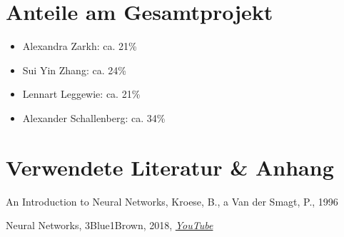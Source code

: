 \documentclass[paper=A4,pagesize=auto,12pt,headinclude=true,footinclude=true,BCOR=0mm,DIV=calc]{scrartcl}
\begin{document}
	\vspace{1cm}
	
	\section{Anteile am Gesamtprojekt}
	\begin{itemize}
		\item Alexandra Zarkh: 			ca. 21\%
		\item Sui Yin Zhang: 			ca. 24\%
		\item Lennart Leggewie: 		ca. 21\%
		\item Alexander Schallenberg: 	ca. 34\%
	\end{itemize}
	
	\vspace{1cm}
	
	\section{Verwendete Literatur \& Anhang}
	\begin{itemize}
		\item{An Introduction to Neural Networks, Kroese, B., a Van der Smagt, P., 1996}
		\hypertarget{3b1b}{\item{Neural Networks, 3Blue1Brown, 2018, \hyperref{https://www.youtube.com/playlist?list=PLZHQObOWTQDNU6R1_67000Dx_ZCJB-3pi}{}{}{\textit{YouTube}}}}
	\end{itemize}
\end{document}
